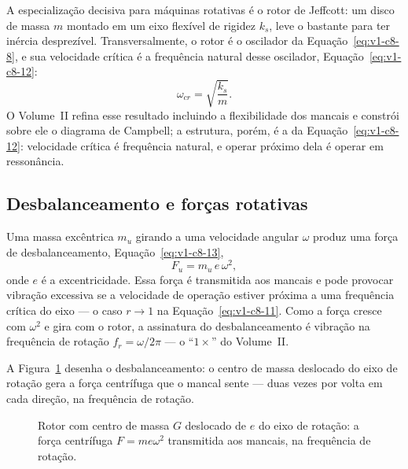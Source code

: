 \documentclass[12pt,a4paper]{article}
\numberwithin{equation}{section}
\numberwithin{table}{section}
\numberwithin{figure}{section}
\begin{document}
A especialização decisiva para máquinas rotativas é o rotor de Jeffcott: um
disco de massa $m$ montado em um eixo flexível de rigidez $k_s$, leve o
bastante para ter inércia desprezível. Transversalmente, o rotor é o
oscilador da Equação~\eqref{eq:v1-c8-8}, e sua velocidade crítica é a
frequência natural desse oscilador, Equação~\eqref{eq:v1-c8-12}:
\begin{equation}\label{eq:v1-c8-12}
\omega_{cr} = \sqrt{\frac{k_s}{m}}.
\end{equation}
O Volume~II refina esse resultado incluindo a flexibilidade dos mancais e
constrói sobre ele o diagrama de Campbell; a estrutura, porém, é a da
Equação~\eqref{eq:v1-c8-12}: velocidade crítica é frequência natural, e
operar próximo dela é operar em ressonância.

\subsection{Desbalanceamento e forças rotativas}\label{sub:v1-c8-desbalanceamento}

Uma massa excêntrica $m_u$ girando a uma velocidade angular $\omega$ produz
uma força de desbalanceamento, Equação~\eqref{eq:v1-c8-13},
\begin{equation}\label{eq:v1-c8-13}
F_u = m_u \, e \, \omega^2,
\end{equation}
onde $e$ é a excentricidade. Essa força é transmitida aos mancais e pode
provocar vibração excessiva se a velocidade de operação estiver próxima a uma
frequência crítica do eixo --- o caso $r \to 1$ na Equação~\eqref{eq:v1-c8-11}.
Como a força cresce com $\omega^2$ e gira com o rotor, a assinatura do
desbalanceamento é vibração na frequência de rotação $f_r = \omega/2\pi$ ---
o ``$1\times$'' do Volume~II.

A Figura~\ref{fig:v1-c8-2} desenha o desbalanceamento: o centro de massa
deslocado do eixo de rotação gera a força centrífuga que o mancal sente ---
duas vezes por volta em cada direção, na frequência de rotação.

\begin{figure}[H]
\centering
{}
\caption[Rotor desbalanceado e força centrífuga.]{Rotor com centro de massa
$G$ deslocado de $e$ do eixo de rotação: a força centrífuga $F = m e
\omega^2$ transmitida aos mancais, na frequência de rotação.}
\label{fig:v1-c8-2}
\end{figure}
\end{document}
